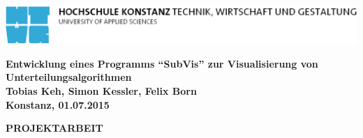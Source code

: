 \begin{titlepage}

\vspace*{-3.5cm}

\begin{flushleft}
\hspace*{-1cm} \includegraphics[width=15.7cm]{content/media/htwg-logo}
\end{flushleft}

\vspace{2.5cm}

\begin{center}
	\huge{
		\textbf{Entwicklung eines Programms \enquote{SubVis} zur Visualisierung von Unterteilungsalgorithmen} \\[5cm]
	}
	\Large{
		\textbf{Tobias Keh, Simon Kessler, Felix Born}} \\[6.5cm]
	\large{
		\textbf{Konstanz, 01.07.2015} \\[2.3cm]
	}
	
	\Huge{
		\textbf{{\sf PROJEKTARBEIT}}
	}
\end{center}

\end{titlepage}